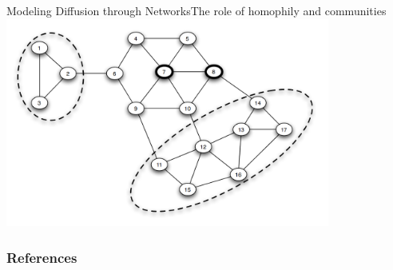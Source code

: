 \documentclass[notes, aspectratio=1610]{beamer}
\begin{document}
\begin{frame}{Modeling Diffusion through Networks}{The role of homophily and communities}
	\centering
	\includegraphics[width=0.8\textwidth]{images/communities_and_diffusion.png}
\end{frame}

\begin{frame}
	\frametitle{References}
	\printbibliography
 \end{frame} 

\end{document}
